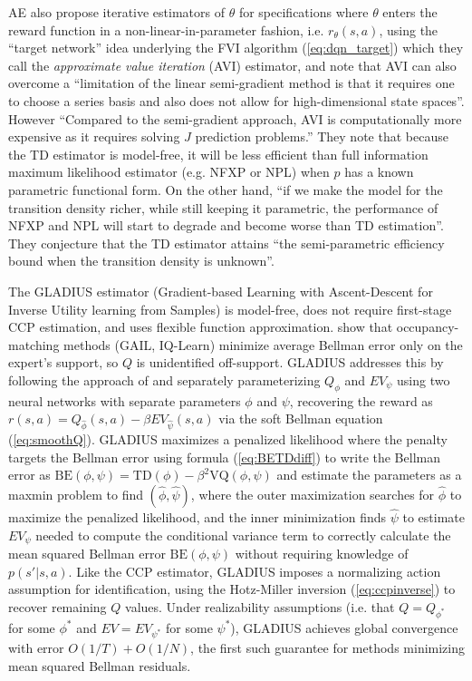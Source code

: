 AE also propose iterative estimators of $\theta$ for specifications where $\theta$ enters the reward function
in a non-linear-in-parameter fashion, i.e. $r_\theta(s,a)$,  using the ``target network'' idea
underlying the FVI algorithm (\ref{eq:dqn_target}) which they call the {\it approximate value iteration\/} (AVI)
estimator, and note that AVI can also overcome a ``limitation of the linear semi-gradient method is that it requires one to choose a series basis and also does not allow for high-dimensional state spaces''.  However
 ``Compared to the semi-gradient approach, AVI is computationally more expensive as it requires solving $J$ prediction problems.'' They note that because the TD estimator is model-free, it will be
less efficient than full information maximum likelihood estimator (e.g. NFXP or NPL) when $p$ has a known parametric
functional form. On the other hand, ``if we make
the model for the transition density richer, while still keeping it parametric, the performance
of NFXP and NPL will start to degrade and become worse than TD estimation''. They conjecture
that the TD estimator attains ``the semi-parametric efficiency bound when the transition density is unknown''.

The GLADIUS estimator \citep{kang:2025} (Gradient-based Learning with Ascent-Descent for Inverse Utility learning from Samples) is model-free, does not require first-stage CCP estimation, and uses flexible function approximation. \citet{kang:2025} show that occupancy-matching methods (GAIL, IQ-Learn) minimize average Bellman error only on the expert's support, so $Q$ is unidentified off-support. GLADIUS 
addresses this by following the approach of \citet{antos:2008} and
 separately parameterizing $Q_{\phi}$ and $EV_{\psi}$ using two neural networks with separate
parameters $\phi$ and $\psi$, recovering the reward as $r(s,a) = Q_{\hat\phi}(s,a) - \beta EV_{\hat\psi}(s,a)$ via the soft Bellman equation (\ref{eq:smoothQ}).
GLADIUS maximizes a penalized likelihood where the penalty targets the Bellman error 
using formula (\ref{eq:BETDdiff}) to write the Bellman error as $\mbox{BE}(\phi,\psi)=\mbox{TD}(\phi)-\beta^2\mbox{VQ}(\phi,\psi)$
and estimate the parameters as a maxmin problem to find $(\hat\phi,\hat\psi)$, 
where the outer maximization searches for $\hat\phi$ to maximize the penalized likelihood, and
the inner minimization finds $\hat\psi$ to estimate $EV_\psi$ needed to compute 
the conditional variance term to correctly calculate the mean squared Bellman
error $\mbox{BE}(\phi,\psi)$ without requiring knowledge of $p(s'|s,a)$. Like the CCP estimator, GLADIUS imposes a normalizing action assumption for identification, using the Hotz-Miller inversion (\ref{eq:ccpinverse}) to recover remaining $Q$ values. Under 
realizability assumptions (i.e. that $Q=Q_{\phi^*}$ for some $\phi^*$ and
$EV=EV_{\psi^*}$ for some $\psi^*$), GLADIUS achieves global convergence with error $O(1/T) + O(1/N)$, the first such 
guarantee for methods minimizing mean squared Bellman residuals.

